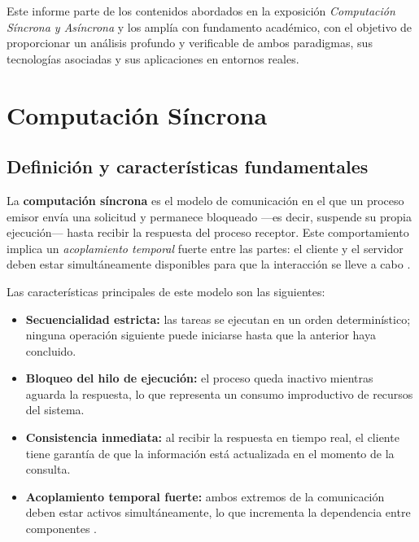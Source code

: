 \documentclass[12pt,a4paper]{article}
\begin{document}
Este informe parte de los contenidos abordados en la exposición \textit{Computación Síncrona y Asíncrona} y los amplía con fundamento académico, con el objetivo de proporcionar un análisis profundo y verificable de ambos paradigmas, sus tecnologías asociadas y sus aplicaciones en entornos reales.
 
\section{Computación Síncrona}
 
\subsection{Definición y características fundamentales}
 
La \textbf{computación síncrona} es el modelo de comunicación en el que un proceso emisor envía una solicitud y permanece bloqueado —es decir, suspende su propia ejecución— hasta recibir la respuesta del proceso receptor. Este comportamiento implica un \textit{acoplamiento temporal} fuerte entre las partes: el cliente y el servidor deben estar simultáneamente disponibles para que la interacción se lleve a cabo \cite{ref3}.
 
Las características principales de este modelo son las siguientes:
 
\begin{itemize}[leftmargin=1.5cm]
  \item \textbf{Secuencialidad estricta:} las tareas se ejecutan en un orden determinístico; ninguna operación siguiente puede iniciarse hasta que la anterior haya concluido.
  \item \textbf{Bloqueo del hilo de ejecución:} el proceso queda inactivo mientras aguarda la respuesta, lo que representa un consumo improductivo de recursos del sistema.
  \item \textbf{Consistencia inmediata:} al recibir la respuesta en tiempo real, el cliente tiene garantía de que la información está actualizada en el momento de la consulta.
  \item \textbf{Acoplamiento temporal fuerte:} ambos extremos de la comunicación deben estar activos simultáneamente, lo que incrementa la dependencia entre componentes \cite{ref4}.
\end{itemize}
 
\end{document}
